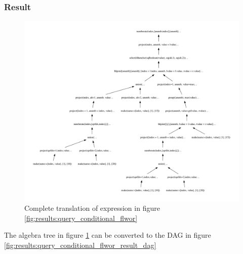 \subsubsection{Result}
\begin{figure}[!htp]
\begin{center}
  \includegraphics[width=1.0\textwidth]{img/graphs/td_impl_flwor_ifthenelse_xq_relalg}
  \caption{Complete translation of expression in figure
  \ref{fig:results:query_conditional_flwor}}
  \label{fig:results:query_conditional_flwor_result}
\end{center}
\end{figure}

The algebra tree in figure \ref{fig:results:query_conditional_flwor_result} can
be converted to the DAG in figure
\ref{fig:results:query_conditional_flwor_result_dag}

